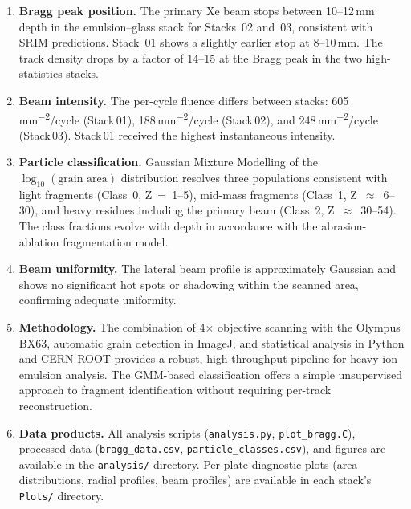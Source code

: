 \documentclass[12pt,a4paper]{article}
\begin{document}
\begin{enumerate}
  \item \textbf{Bragg peak position.} The primary Xe beam stops between
        10--12\,mm depth in the emulsion--glass stack for Stacks~02
        and~03, consistent with SRIM predictions. Stack~01 shows a
        slightly earlier stop at 8--10\,mm. The track density drops by
        a factor of 14--15 at the Bragg peak in the two
        high-statistics stacks.

  \item \textbf{Beam intensity.} The per-cycle fluence differs between
        stacks: 605\,\si{\mm^{-2}}/cycle (Stack\,01),
        188\,\si{\mm^{-2}}/cycle (Stack\,02), and
        248\,\si{\mm^{-2}}/cycle (Stack\,03). Stack\,01 received the
        highest instantaneous intensity.

  \item \textbf{Particle classification.} Gaussian Mixture Modelling
        of the $\log_{10}(\text{grain area})$ distribution resolves
        three populations consistent with light fragments (Class~0,
        Z~=~1--5), mid-mass fragments (Class~1, Z~$\approx$~6--30),
        and heavy residues including the primary beam (Class~2,
        Z~$\approx$~30--54). The class fractions evolve with depth in
        accordance with the abrasion-ablation fragmentation model.

  \item \textbf{Beam uniformity.} The lateral beam profile is
        approximately Gaussian and shows no significant hot spots or
        shadowing within the scanned area, confirming adequate
        uniformity.

  \item \textbf{Methodology.} The combination of 4$\times$ objective
        scanning with the Olympus BX63, automatic grain detection in
        ImageJ, and statistical analysis in Python and CERN ROOT
        provides a robust, high-throughput pipeline for heavy-ion
        emulsion analysis. The GMM-based classification offers a
        simple unsupervised approach to fragment identification
        without requiring per-track reconstruction.

  \item \textbf{Data products.} All analysis scripts
        (\texttt{analysis.py}, \texttt{plot\_bragg.C}),
        processed data (\texttt{bragg\_data.csv},
        \texttt{particle\_classes.csv}), and figures are available
        in the \texttt{analysis/} directory. Per-plate diagnostic
        plots (area distributions, radial profiles, beam profiles)
        are available in each stack's \texttt{Plots/} directory.
\end{enumerate}
\end{document}
